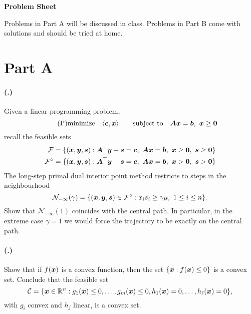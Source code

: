 \documentclass{article}
\newcounter{problemSheetNumber}
\newcounter{problems}
\renewcommand{\problem}{\paragraph{(\theproblemSheetNumber.\theproblems)}\addtocounter{problems}{1}}
\begin{document}
 
\begin{center}
{\Large {\bf Problem Sheet \theproblemSheetNumber}}
\end{center}

Problems in Part A will be discussed in class. Problems in Part B come with solutions and should be tried at home. 

\section*{Part A}

\problem Given a linear programming problem,
\begin{equation}\label{eq:standard}\tag{P}
 \minimize \ip{\vct{c}}{\vct{x}} \quad \subjto \mtx{A}\vct{x}=\vct{b}, \ \vct{x}\geq \zerovct
\end{equation}
recall the feasible sets
\begin{align*}
 \mathcal{F} &= \{(\vct{x},\vct{y},\vct{s}) \mid \mtx{A}^{\trans}\vct{y}+\vct{s}=\vct{c}, \ \mtx{A}\vct{x}=\vct{b}, \ \vct{x}\geq \zerovct, \ \vct{s}\geq \zerovct\}\\
 \mathcal{F}^{\circ} &= \{(\vct{x},\vct{y},\vct{s}) \mid \mtx{A}^{\trans}\vct{y}+\vct{s}=\vct{c}, \ \mtx{A}\vct{x}=\vct{b}, \ \vct{x}> \zerovct, \ \vct{s}> \zerovct\}\\
\end{align*}
The long-step primal dual interior point method restricts to steps in the neighbourhood
\begin{equation*}
\mathcal{N}_{-\infty}(\gamma) = \{(\bm{x},\bm{y},\bm{s})\in \mathcal{F}^{\circ} \mathrel{\mathop{:}} x_is_i\geq \gamma \mu, \ 1\leq i\leq n\}.
\end{equation*}
Show that $\mathcal{N}_{-\infty}(1)$ coincides with the central path. In particular, in the extreme case $\gamma=1$ we would force the trajectory to be exactly on the central path.

\problem Show that if $f(\bm{x})$ is a convex function, then the set $\{\bm{x}\mathrel{\mathop{:}} f(\bm{x})\leq 0\}$ is a convex set. Conclude that the feasible set 
\begin{equation*}
 \mathcal{C} = \{\bm{x}\in \mathbb{R}^n \mathrel{\mathop{:}} g_1(\bm{x})\leq 0,\dots,g_m(\bm{x})\leq 0, h_1(\bm{x})=0,\dots,h_\ell(\bm{x})=0\},
\end{equation*}
with $g_i$ convex and $h_j$ linear, is a convex set.
\end{document}
